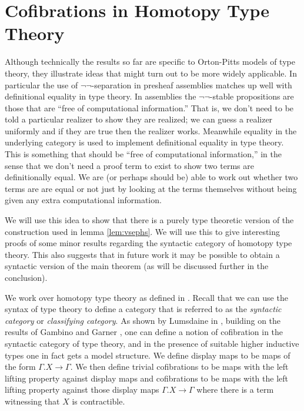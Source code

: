 \documentclass[a4paper]{amsart}
\theoremstyle{definition}
\begin{document}
\section{Cofibrations in Homotopy Type Theory}
\label{sec:typetheory}

\newcommand{\fibre}[2]{\Sigma_{x : A} #1 = #2}


Although technically the results so far are specific to Orton-Pitts
models of type theory, they illustrate ideas that might turn out to be
more widely applicable. In particular the use of
$\neg \neg$-separation in presheaf assemblies matches up well with
definitional equality in type theory. In assemblies the
$\neg \neg$-stable propositions are those that are ``free of
computational information.'' That is, we don't need to be told a
particular realizer to show they are realized; we can guess a realizer
uniformly and if they are true then the realizer works. Meanwhile
equality in the underlying category is used to implement definitional
equality in type theory. This is something that should be ``free of
computational information,'' in the sense that we don't need a proof
term to exist to show two terms are definitionally equal. We are (or
perhaps should be) able to work out whether two terms are are equal or
not just by looking at the terms themselves without being given any
extra computational information.

We will use this idea to show that there is a purely type theoretic
version of the construction used in lemma \ref{lem:vsephs}. We will
use this to give interesting proofs of some minor results regarding
the syntactic category of homotopy type theory. This also suggests
that in future work it may be possible to obtain a syntactic version of
the main theorem (as will be discussed further in the conclusion).


We work over homotopy type theory as defined in
\cite{hottbook}. Recall that we can use the syntax of type theory to
define a category that is referred to as the \emph{syntactic category}
or \emph{classifying category}.  As shown by Lumsdaine in
\cite{lumsdainecofibtt}, building on the results of Gambino and Garner
\cite{gambinogarner}, one can define a notion of cofibration in the
syntactic category of type theory, and in the presence of suitable
higher inductive types one in fact gets a model structure. We define
display maps to be maps of the form $\Gamma.X \to \Gamma$. We then
define trivial cofibrations to be maps with the left lifting property
against display maps and cofibrations to be maps with the left lifting
property against those display maps $\Gamma.X \to \Gamma$ where there
is a term witnessing that $X$ is contractible.
\end{document}
